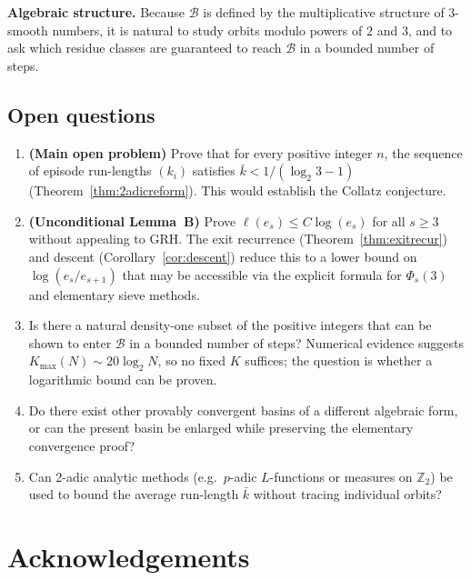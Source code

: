 \documentclass[12pt]{amsart}
\theoremstyle{definition}
\newcommand{\basin}{\mathcal{B}}
\begin{document}
\textbf{Algebraic structure.}
Because $\basin$ is defined by the multiplicative structure of 3-smooth
numbers, it is natural to study orbits modulo powers of $2$ and $3$,
and to ask which residue classes are guaranteed to reach $\basin$ in a
bounded number of steps.

\subsection*{Open questions}

\begin{enumerate}[label=(\arabic*)]
  \item \textbf{(Main open problem)} Prove that for every positive integer $n$,
        the sequence of episode run-lengths $(k_i)$ satisfies $\bar{k} < 1/(\log_2 3 - 1)$
        (Theorem~\ref{thm:2adicreform}).  This would establish the Collatz conjecture.
  \item \textbf{(Unconditional Lemma~B)} Prove $\ell(e_s) \leq C \log(e_s)$ for
        all $s \geq 3$ without appealing to GRH.  The exit recurrence
        (Theorem~\ref{thm:exitrecur}) and descent (Corollary~\ref{cor:descent})
        reduce this to a lower bound on $\log(e_s/e_{s+1})$ that may be
        accessible via the explicit formula for $\Phi_s(3)$ and elementary
        sieve methods.
  \item Is there a natural density-one subset of the positive integers that
        can be shown to enter $\basin$ in a bounded number of steps?
        Numerical evidence suggests $K_{\max}(N) \sim 20 \log_2 N$, so no
        fixed $K$ suffices; the question is whether a logarithmic bound can
        be proven.
  \item Do there exist other provably convergent basins of a different
        algebraic form, or can the present basin be enlarged while preserving
        the elementary convergence proof?
  \item Can 2-adic analytic methods (e.g.\ $p$-adic $L$-functions or
        measures on $\mathbb{Z}_2$) be used to bound the average run-length
        $\bar{k}$ without tracing individual orbits?
\end{enumerate}

\section*{Acknowledgements}
\end{document}
